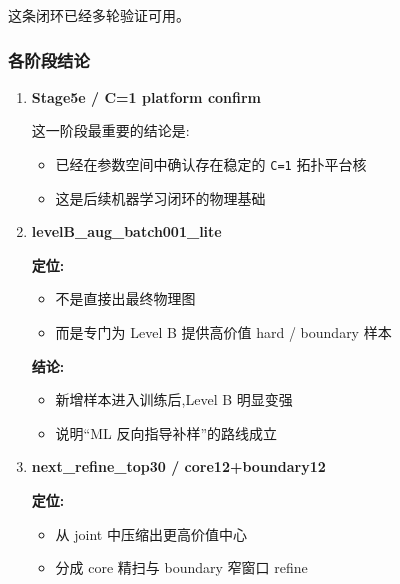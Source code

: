 \documentclass[lang=cn,scheme=chinese,color=blue,device=normal,toc=onecol,math=cm]{elegantbook}
\begin{document}
这条闭环已经多轮验证可用。\par


\subsubsection{各阶段结论}


\begin{enumerate}
\item \textbf{Stage5e /\allowbreak{} C=1 platform confirm}\par
 
这一阶段最重要的结论是:\par
 
\begin{itemize}
\item 已经在参数空间中确认存在稳定的 \texttt{C=1} 拓扑平台核
\item 这是后续机器学习闭环的物理基础
\end{itemize}
\item \textbf{levelB\_\allowbreak{}aug\_\allowbreak{}batch001\_\allowbreak{}lite}\par
 
\textbf{定位:}\par
 
\begin{itemize}
\item 不是直接出最终物理图
\item 而是专门为 Level B 提供高价值 hard /\allowbreak{} boundary 样本
\end{itemize}
 
\textbf{结论:}\par
 
\begin{itemize}
\item 新增样本进入训练后,Level B 明显变强
\item 说明“ML 反向指导补样”的路线成立
\end{itemize}
\item \textbf{next\_\allowbreak{}refine\_\allowbreak{}top30 /\allowbreak{} core12+boundary12}\par
 
\textbf{定位:}\par
 
\begin{itemize}
\item 从 joint 中压缩出更高价值中心
\item 分成 core 精扫与 boundary 窄窗口 refine
\end{itemize}
 

\end{enumerate}
\end{document}
